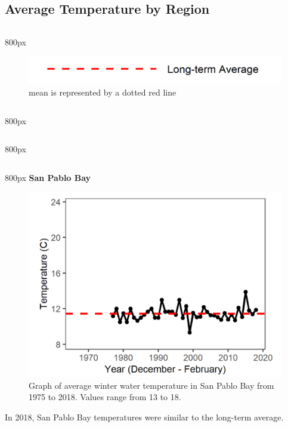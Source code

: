\documentclass[
]{book}
\begin{document}
\hypertarget{average-temperature-by-region-3}{%
\subsection{Average Temperature by Region}\label{average-temperature-by-region-3}}

\begin{column}{800px\textwidth}
\begin{figure}
\includegraphics[width=15.25in]{figures/mline} \caption{mean is represented by a dotted red line}\label{fig:unnamed-chunk-151}
\end{figure}
\end{column}

\begin{column}{800px\textwidth}
\end{column}

\begin{column}{800px\textwidth}
\end{column}

\begin{column}{800px\textwidth}
\textbf{San Pablo Bay}

\begin{figure}
\includegraphics[width=15.25in]{figures/temp_splwinter} \caption{Graph of average winter water temperature in San Pablo Bay from 1975 to 2018. Values range from 13 to 18.}\label{fig:unnamed-chunk-152}
\end{figure}

In 2018, San Pablo Bay temperatures were similar to the long-term average.
\end{column}
\end{document}
